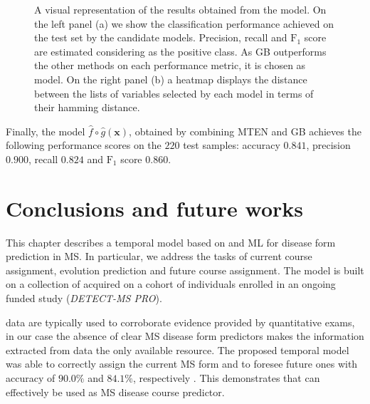  \begin{figure}[h!]
	\centering
	 \hfill%
	\caption{A visual representation of the results obtained from the \F model. On the left panel (a) we show the classification performance achieved on the test set by the candidate models. Precision, recall and $\text{F}_1$ score are estimated considering \SP as the positive class. As GB outperforms the other methods on each performance metric, it is chosen as \F model. On the right panel (b) a heatmap displays the distance between the lists of variables selected by each model in terms of their hamming distance. }\label{fig:f}
\end{figure}


%
Finally, the \FOG model $\hat{f} \circ \hat{g}(\bm{x})$, obtained by combining MTEN and GB achieves the following performance scores on the $220$ test samples: accuracy $0.841$, precision $0.900$, recall $0.824$ and $\text{F}_1$ score $0.860$.


\section{Conclusions and future works}

This chapter describes a temporal model based on \PCOs and ML for disease form prediction in MS.
In particular, we address the tasks of current course assignment, \PCOs evolution prediction and future course assignment. The model is built on a collection of \PCOs acquired on a cohort of individuals enrolled in an ongoing funded study (\textit{DETECT-MS PRO}).

\PCOs data are typically used to corroborate evidence provided by quantitative exams, in our case the absence of clear MS disease form predictors makes the information extracted from \PCOs data the only available resource.
The proposed temporal model was able to correctly assign the current MS form and to foresee future ones with accuracy of $90.0\%$ and $84.1\%$, respectively .
This demonstrates that \PCOs can effectively be used as MS disease course predictor.

